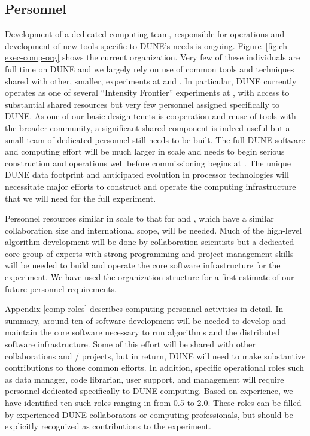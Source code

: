 \subsection{Personnel}


Development of a  dedicated  computing team, responsible for operations and development of new tools specific to DUNE's needs is ongoing. 
Figure~\ref{fig:ch-exec-comp-org} shows the current organization.  Very few of these individuals are full time on DUNE and we largely rely on use of common tools and techniques shared with other, smaller, experiments at and . In particular, DUNE currently operates as one of several ``Intensity Frontier'' experiments at , with access to substantial shared resources but very few personnel assigned specifically to DUNE.  As one of our basic design tenets is cooperation and reuse of tools with the broader community, a significant shared component is indeed useful but a small team of dedicated personnel still needs to be built. 
The full DUNE software and computing effort will be much larger in scale and needs to begin serious construction and operations well before commissioning begins at . The unique DUNE data footprint and anticipated evolution in processor technologies will necessitate major efforts to construct and operate the computing infrastructure that we will need for the full experiment.

Personnel resources similar in scale to that for  and , which have a similar collaboration size and international scope, will be needed.  
Much of the high-level algorithm development will be done by collaboration scientists but a dedicated core group of experts with strong programming and project management skills will be needed to build and operate the core software infrastructure for the experiment.  We have used the  organization structure for a first estimate of our future personnel requirements.

Appendix \ref{comp-roles} describes  computing personnel activities in detail.  In summary, around ten  of software development will be needed to develop and maintain the core software necessary to run  algorithms and the distributed software infrastructure.  Some of this effort will be shared with other collaborations and / projects, but in return, DUNE will need to make substantive contributions to those common efforts. In addition, %
specific operational roles such as data manager, code librarian, user support, and management %
will require personnel dedicated specifically to DUNE computing. Based on  experience, we have identified ten such roles ranging in  from 0.5 to 2.0.  These roles can be filled by experienced DUNE collaborators or computing professionals, but should be explicitly recognized as contributions to the experiment. 




